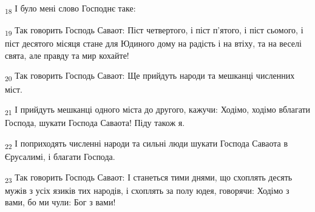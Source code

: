\begin{tcolorbox}
\textsubscript{18} І було мені слово Господнє таке:
\end{tcolorbox}
\begin{tcolorbox}
\textsubscript{19} Так говорить Господь Саваот: Піст четвертого, і піст п'ятого, і піст сьомого, і піст десятого місяця стане для Юдиного дому на радість і на втіху, та на веселі свята, але правду та мир кохайте!
\end{tcolorbox}
\begin{tcolorbox}
\textsubscript{20} Так говорить Господь Саваот: Ще прийдуть народи та мешканці численних міст.
\end{tcolorbox}
\begin{tcolorbox}
\textsubscript{21} І прийдуть мешканці одного міста до другого, кажучи: Ходімо, ходімо вблагати Господа, шукати Господа Саваота! Піду також я.
\end{tcolorbox}
\begin{tcolorbox}
\textsubscript{22} І поприходять численні народи та сильні люди шукати Господа Саваота в Єрусалимі, і благати Господа.
\end{tcolorbox}
\begin{tcolorbox}
\textsubscript{23} Так говорить Господь Саваот: І станеться тими днями, що схоплять десять мужів з усіх язиків тих народів, і схоплять за полу юдея, говорячи: Ходімо з вами, бо ми чули: Бог з вами!
\end{tcolorbox}
